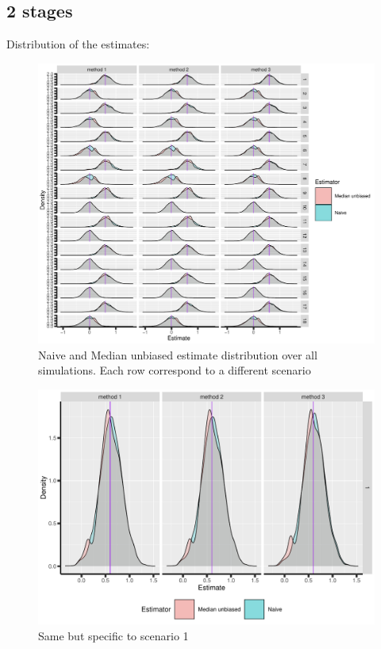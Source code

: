 \documentclass[12pt]{article}
\begin{document}
\subsection{2 stages}
\label{sec:org53f93db}
Distribution of the estimates:
\begin{figure}[!h]
\centering
\includegraphics[trim={0 0 0 0},width=1\textwidth]{./figures/gg2stage-estimate-density.pdf}
\caption{Naive and Median unbiased estimate distribution over all simulations. Each row correspond to a different scenario}
\end{figure}

\begin{figure}[!h]
\centering
\includegraphics[trim={0 0 0 0},width=\textwidth]{./figures/gg2stage-estimate-density-scenario1.pdf}
\caption{Same but specific to scenario 1}
\end{figure}
\end{document}

